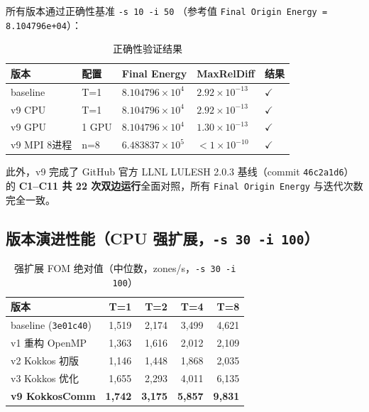 \documentclass[UTF8,12pt,a4paper]{ctexart}
\begin{document}
所有版本通过正确性基准 \texttt{-s 10 -i 50}
（参考值 \texttt{Final Origin Energy = 8.104796e+04}）：

\begin{table}[H]
\centering
\caption{正确性验证结果}
\label{tab:correctness}
\begin{tabular}{lllll}
\toprule
\textbf{版本} & \textbf{配置} & \textbf{Final Energy} &
\textbf{MaxRelDiff} & \textbf{结果} \\
\midrule
baseline   & T=1    & $8.104796\times10^{4}$ & $2.92\times10^{-13}$ & $\checkmark$ \\
v9 CPU     & T=1    & $8.104796\times10^{4}$ & $2.92\times10^{-13}$ & $\checkmark$ \\
v9 GPU     & 1 GPU  & $8.104796\times10^{4}$ & $1.30\times10^{-13}$ & $\checkmark$ \\
v9 MPI 8进程 & n=8  & $6.483837\times10^{5}$ & $<1\times10^{-10}$   & $\checkmark$ \\
\bottomrule
\end{tabular}
\end{table}

此外，v9 完成了 GitHub 官方 LLNL LULESH 2.0.3 基线（commit \texttt{46c2a1d6}）的
\textbf{C1--C11 共 22 次双边运行}全面对照，所有 \texttt{Final Origin Energy}
与迭代次数完全一致。

\subsection{版本演进性能（CPU 强扩展，\texttt{-s 30 -i 100}）}

\begin{table}[H]
\centering
\caption{强扩展 FOM 绝对值（中位数，zones/s，\texttt{-s 30 -i 100}）}
\label{tab:strong30}
\begin{tabular}{lrrrr}
\toprule
\textbf{版本} & \textbf{T=1} & \textbf{T=2} & \textbf{T=4} & \textbf{T=8} \\
\midrule
baseline (\texttt{3e01c40}) & 1,519 & 2,174 & 3,499 & 4,621 \\
v1 重构 OpenMP              & 1,363 & 1,616 & 2,012 & 2,109 \\
v2 Kokkos 初版              & 1,146 & 1,448 & 1,868 & 2,035 \\
v3 Kokkos 优化              & 1,655 & 2,293 & 4,011 & 6,135 \\
\textbf{v9 KokkosComm}      & \textbf{1,742} & \textbf{3,175} & \textbf{5,857} & \textbf{9,831} \\
\bottomrule
\end{tabular}
\end{table}
\end{document}
